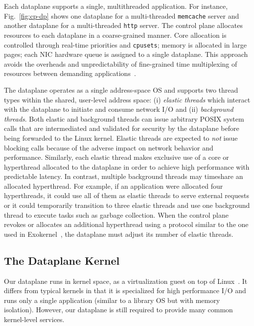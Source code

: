 Each \ix dataplane supports a single, multithreaded application. For
instance, Fig.~\ref{fig:cp-dp} shows one dataplane for a
multi-threaded \texttt{memcache} server and another dataplane for a
multi-threaded \texttt{http} server. The control plane allocates
resources to each dataplane in a coarse-grained manner. Core
allocation is controlled through real-time priorities and
\texttt{cpusets}; memory is allocated in large pages; each NIC
hardware queue is assigned to a single dataplane. This approach avoids
the overheads and unpredictability of fine-grained time multiplexing
of resources between demanding
applications~\cite{DBLP:conf/eurosys/LeverichK14}.

The \ix dataplane operates as a single address-space OS and supports
two thread types within the shared, user-level address space: (i)
\emph{elastic threads} which interact with the \ix dataplane to
initiate and consume network I/O and (ii) \emph{background threads}.
Both elastic and background threads can issue arbitrary POSIX system
calls that are intermediated and validated for security by the
dataplane before being forwarded to the Linux kernel. Elastic threads
are expected to \emph{not} issue blocking calls because of the adverse
impact on network behavior and performance. Similarly, each elastic
thread makes exclusive use of a core or hyperthread allocated to the
dataplane in order to achieve high performance with predictable
latency. In contrast, multiple background threads may timeshare an
allocated hyperthread. For example, if an application were allocated
four hyperthreads, it could use all of them as elastic threads to
serve external requests or it could temporarily transition to three
elastic threads and use one background thread to execute tasks such as
garbage collection. When the control plane revokes or allocates an
additional hyperthread using a protocol similar to the one used in
Exokernel~\cite{DBLP:conf/sosp/EnglerKO95}, the dataplane must adjust
its number of elastic threads.


\subsection{The Dataplane Kernel}
\label{sec:impl:dpkernel}

Our dataplane runs in kernel space, as a virtualization guest on
top of Linux~\cite{dune}. It differs from typical kernels
in that it is specialized for high performance I/O and runs only
a single application (similar to a library OS but with memory
isolation). However, our dataplane is still required to provide
many common kernel-level services.

